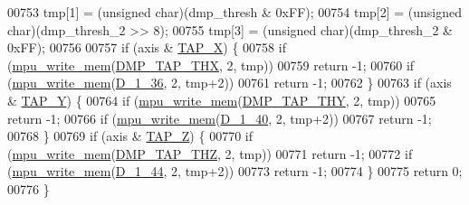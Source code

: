 \begin{DoxyCode}
00753     tmp[1] = (\textcolor{keywordtype}{unsigned} char)(dmp\_thresh & 0xFF);
00754     tmp[2] = (\textcolor{keywordtype}{unsigned} char)(dmp\_thresh\_2 >> 8);
00755     tmp[3] = (\textcolor{keywordtype}{unsigned} char)(dmp\_thresh\_2 & 0xFF);
00756 
00757     \textcolor{keywordflow}{if} (axis & \hyperlink{group___d_r_i_v_e_r_s_ga22a5ea75ee18a788b441f66fffe83586}{TAP\_X}) \{
00758         \textcolor{keywordflow}{if} (\hyperlink{group___d_r_i_v_e_r_s_gafea59910bc3dd30ba3356b1c75213a5f}{mpu\_write\_mem}(\hyperlink{dmpmap_8h_a81e1f8686497fc2d846c8747c479466a}{DMP\_TAP\_THX}, 2, tmp))
00759             \textcolor{keywordflow}{return} -1;
00760         \textcolor{keywordflow}{if} (\hyperlink{group___d_r_i_v_e_r_s_gafea59910bc3dd30ba3356b1c75213a5f}{mpu\_write\_mem}(\hyperlink{group___d_r_i_v_e_r_s_ga359aac18087bef8a3f044faf13952fa2}{D\_1\_36}, 2, tmp+2))
00761             \textcolor{keywordflow}{return} -1;
00762     \}
00763     \textcolor{keywordflow}{if} (axis & \hyperlink{group___d_r_i_v_e_r_s_ga762f9521bf33c9ba7a77595268b108ec}{TAP\_Y}) \{
00764         \textcolor{keywordflow}{if} (\hyperlink{group___d_r_i_v_e_r_s_gafea59910bc3dd30ba3356b1c75213a5f}{mpu\_write\_mem}(\hyperlink{dmpmap_8h_a5008aa495d3ab6e59429cdc9c9e39c31}{DMP\_TAP\_THY}, 2, tmp))
00765             \textcolor{keywordflow}{return} -1;
00766         \textcolor{keywordflow}{if} (\hyperlink{group___d_r_i_v_e_r_s_gafea59910bc3dd30ba3356b1c75213a5f}{mpu\_write\_mem}(\hyperlink{group___d_r_i_v_e_r_s_gae0dfa8b55558dff48604d4ac2c28fa9c}{D\_1\_40}, 2, tmp+2))
00767             \textcolor{keywordflow}{return} -1;
00768     \}
00769     \textcolor{keywordflow}{if} (axis & \hyperlink{group___d_r_i_v_e_r_s_gac2949c36d5f4eeb4769fdcf2d99284fd}{TAP\_Z}) \{
00770         \textcolor{keywordflow}{if} (\hyperlink{group___d_r_i_v_e_r_s_gafea59910bc3dd30ba3356b1c75213a5f}{mpu\_write\_mem}(\hyperlink{dmpmap_8h_a54cb4c0d23dd19747f5199a36f624b40}{DMP\_TAP\_THZ}, 2, tmp))
00771             \textcolor{keywordflow}{return} -1;
00772         \textcolor{keywordflow}{if} (\hyperlink{group___d_r_i_v_e_r_s_gafea59910bc3dd30ba3356b1c75213a5f}{mpu\_write\_mem}(\hyperlink{group___d_r_i_v_e_r_s_ga4fd075d6c0e817fbafca24af8305386e}{D\_1\_44}, 2, tmp+2))
00773             \textcolor{keywordflow}{return} -1;
00774     \}
00775     \textcolor{keywordflow}{return} 0;
00776 \}
\end{DoxyCode}
